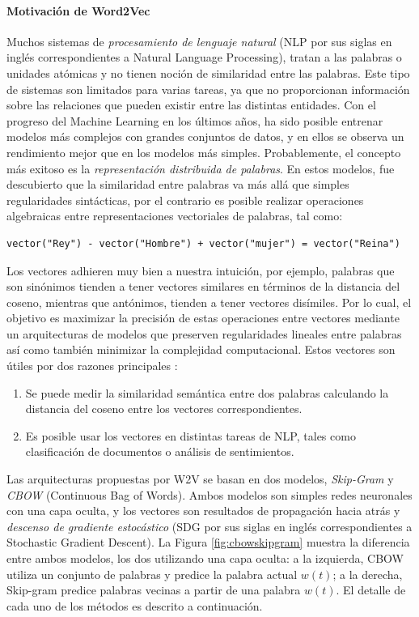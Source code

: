 \paragraph{Motivación de Word2Vec}
Muchos sistemas de \textit{procesamiento de lenguaje natural} (NLP por sus siglas en inglés correspondientes a Natural Language Processing), tratan a las palabras o unidades atómicas y no tienen noción de similaridad entre las palabras. Este tipo de sistemas son limitados para varias tareas, ya que no proporcionan información sobre las relaciones que pueden existir entre las distintas entidades. Con el progreso del Machine Learning en los últimos años, ha sido posible entrenar modelos más complejos con grandes conjuntos de datos, y en ellos se observa un rendimiento mejor que en los modelos más simples. Probablemente, el concepto más exitoso es la \textit{representación distribuida de palabras}. En estos modelos, fue descubierto que la similaridad entre palabras va más allá que simples regularidades sintácticas, por el contrario es posible realizar operaciones algebraicas entre representaciones vectoriales de palabras, tal como:

\begin{verbatim}
vector("Rey") - vector("Hombre") + vector("mujer") = vector("Reina")
\end{verbatim}

Los vectores adhieren muy bien a nuestra intuición, por ejemplo, palabras que son sinónimos tienden a tener vectores similares en términos de la distancia del coseno, mientras que antónimos, tienden a tener vectores disímiles. Por lo cual, el objetivo es maximizar la precisión de estas operaciones entre vectores mediante un arquitecturas de modelos que preserven regularidades lineales entre palabras así como también minimizar la complejidad computacional. Estos vectores son útiles por dos razones principales \citep{mccormick2016word2vec}:

\begin{enumerate}
	\item Se puede medir la similaridad semántica entre dos palabras calculando la distancia del coseno entre los vectores correspondientes.
	\item Es posible usar los vectores en distintas tareas de NLP, tales como clasificación de documentos o análisis de sentimientos.
\end{enumerate}

\bigskip Las arquitecturas propuestas por W2V se basan en dos modelos, \textit{Skip-Gram} y \textit{CBOW} (Continuous Bag of Words). Ambos modelos son simples redes neuronales con una capa oculta, y los vectores son resultados de propagación hacia atrás y \textit{descenso de gradiente estocástico} (SDG por sus siglas en inglés correspondientes a Stochastic Gradient Descent). La Figura \ref{fig:cbowskipgram} muestra la diferencia entre ambos modelos, los dos utilizando una capa oculta: a la izquierda, CBOW utiliza un conjunto de palabras y predice la palabra actual \(w(t)\); a la derecha, Skip-gram predice palabras vecinas a partir de una palabra \(w(t)\). El detalle de cada uno de los métodos es descrito a continuación.

